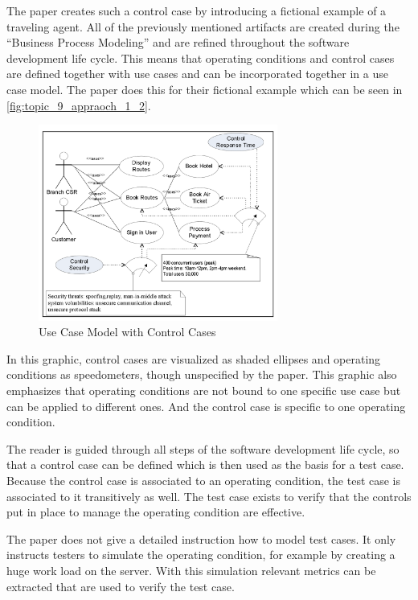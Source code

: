The paper creates such a control case by introducing a fictional example of a traveling agent.
All of the previously mentioned artifacts are created during the \enquote{Business Process Modeling} and are refined throughout the software development life cycle.
This means that operating conditions and control cases are defined together with use cases and can be incorporated together in a use case model.
The paper does this for their fictional example which can be seen in \autoref{fig:topic_9_appraoch_1_2}. 

\begin{figure}[h!]
	\centering
	\includegraphics[width=0.7\textwidth]{../images/topic_9_approach_1_2.png}
	\caption{Use Case Model with Control Cases~\cite{ZouPavlovski2008}}
	\label{fig:topic_9_appraoch_1_2}
\end{figure}

In this graphic, control cases are visualized as shaded ellipses and operating conditions as speedometers, though unspecified by the paper. 
This graphic also emphasizes that operating conditions are not bound to one specific use case but can be applied to different ones.
And the control case is specific to one operating condition.


The reader is guided through all steps of the software development life cycle, so that a control case can be defined which is then used as the basis for a test case. Because the control case is associated to an operating condition, the test case is associated to it transitively as well.
The test case exists to verify that the controls put in place to manage the operating condition are effective.

The paper does not give a detailed instruction how to model test cases. It only instructs testers to simulate the operating condition, for example by creating a huge work load on the server.
With this simulation relevant metrics can be extracted that are used to verify the test case.



